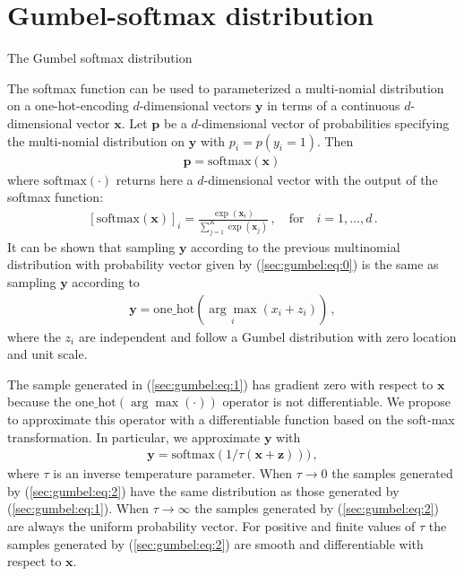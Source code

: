 
\section{Gumbel-softmax distribution}

The Gumbel softmax distribution 

The softmax function can be used to parameterized a multi-nomial distribution
on a one-hot-encoding $d$-dimensional vectors $\mathbf{y}$ in terms of a
continuous $d$-dimensional vector $\mathbf{x}$. Let $\mathbf{p}$ be a $d$-dimensional vector of probabilities
specifying the multi-nomial distribution on $\mathbf{y}$ with $p_i = p(y_i=1)$. Then
\begin{align}
\mathbf{p} = \text{softmax}(\mathbf{x})\,\label{sec:gumbel:eq:0}
\end{align}
where $\text{softmax}(\cdot)$ returns here a $d$-dimensional vector with the output of the softmax function:
\begin{align}
\left[\text{softmax}(\mathbf{x})\right]_i = \frac{\exp(\mathbf{x}_i)}{\sum_{j=1}^K\exp(\mathbf{x}_j)}\,,\quad\text{for}\quad i = 1,\ldots,d\,.
\end{align}
It can be shown that sampling $\mathbf{y}$ according to the previous multinomial distribution with probability vector 
given by (\ref{sec:gumbel:eq:0}) is the same as sampling $\mathbf{y}$ according to
\begin{align}
\mathbf{y} = \text{one\_hot}(\underset{i}{\arg\max} (x_i + z_i))\,,\label{sec:gumbel:eq:1}
\end{align}
where the $z_i$ are independent and follow a Gumbel distribution with zero location and unit scale.

The sample generated in (\ref{sec:gumbel:eq:1}) has gradient zero with respect to
$\mathbf{x}$ because the $\text{one\_hot}(\arg\max(\cdot))$
operator is not differentiable.
We propose to approximate this operator with a differentiable function based on the soft-max transformation.
In particular, we approximate $\mathbf{y}$ with 
\begin{align}
\mathbf{y} = \text{softmax}(1 / \tau (\mathbf{x} + \mathbf{z})))\,,\label{sec:gumbel:eq:2}
\end{align}
where $\tau$ is an inverse temperature parameter. When $\tau \rightarrow 0$ the samples generated by (\ref{sec:gumbel:eq:2})
have the same distribution as those generated by (\ref{sec:gumbel:eq:1}). When $\tau \rightarrow \infty$
the samples generated by (\ref{sec:gumbel:eq:2}) are always the uniform probability vector. For positive and finite values
of $\tau$ the samples generated by (\ref{sec:gumbel:eq:2}) are smooth and differentiable with respect to $\mathbf{x}$.






